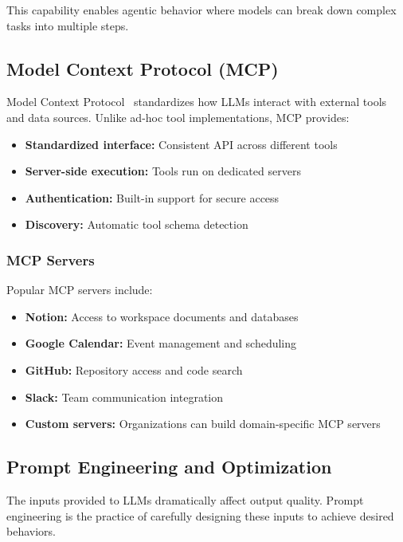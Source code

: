 \documentclass[class=article,crop=false]{standalone}
\begin{document}
This capability enables agentic behavior where models can break down complex tasks into multiple steps.

\subsection{Model Context Protocol (MCP)}
\label{sec:inference:mcp}

Model Context Protocol~\cite{mcp} standardizes how LLMs interact with external tools and data sources. Unlike ad-hoc tool implementations, MCP provides:

\begin{itemize}
  \item \textbf{Standardized interface:} Consistent API across different tools
  \item \textbf{Server-side execution:} Tools run on dedicated servers
  \item \textbf{Authentication:} Built-in support for secure access
  \item \textbf{Discovery:} Automatic tool schema detection
\end{itemize}

\subsubsection{MCP Servers}

Popular MCP servers include:
\begin{itemize}
  \item \textbf{Notion:} Access to workspace documents and databases
  \item \textbf{Google Calendar:} Event management and scheduling
  \item \textbf{GitHub:} Repository access and code search
  \item \textbf{Slack:} Team communication integration
  \item \textbf{Custom servers:} Organizations can build domain-specific MCP servers
\end{itemize}

\subsection{Prompt Engineering and Optimization}
\label{sec:inference:prompting}

The inputs provided to LLMs dramatically affect output quality. Prompt engineering is the practice of carefully designing these inputs to achieve desired behaviors.
\end{document}
